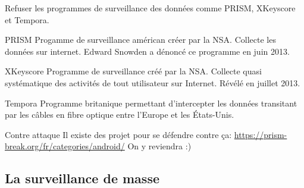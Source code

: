 \documentclass[aspectratio=169]{beamer}
\begin{document}
\begin{frame}{}
Refuser les programmes de surveillance des données comme PRISM, XKeyscore et Tempora.

\begin{tiny}
\begin{block}{PRISM}
Progamme de surveillance américan créer par la NSA. Collecte les données sur internet.
Edward Snowden a dénoncé ce programme en juin 2013.
\end{block}

\begin{block}{XKeyscore}
Programme de surveillance créé par la NSA. Collecte quasi systématique des activités de tout utilisateur sur Internet. Révélé en juillet 2013.
\end{block}

\begin{block}{Tempora}
Programme britanique permettant d'intercepter les données transitant par les câbles en fibre optique entre l'Europe et les États-Unis.
\end{block}
\end{tiny}
\end{frame}

\begin{frame}{Contre attaque}
Il existe des projet pour se défendre contre ça:
\url{https://prism-break.org/fr/categories/android/}\newline
\newline
On y reviendra :)
\end{frame}

\subsection{La surveillance de masse}

\begin{frame}
\begin{center}
\large{\color{cvp}{La surveillance de masse}}
\end{center}
\end{frame}
\end{document}
